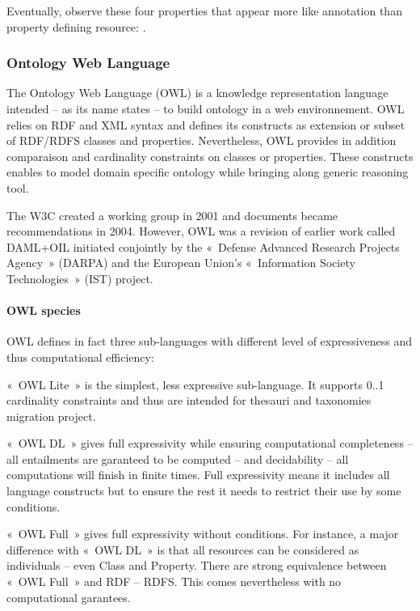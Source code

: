 Eventually, observe these four properties that appear more like annotation than property defining resource: .





\subsubsection*{Ontology Web Language}
The Ontology Web Language (OWL) is a knowledge representation language intended – as its name states – to build ontology in a web environnement. 
OWL relies on RDF and XML syntax and defines its constructs as extension or subset of RDF/RDFS classes and properties. 
Nevertheless, OWL provides in addition comparaison and cardinality constraints on classes or properties. 
These constructs enables to model domain specific ontology while bringing along generic reasoning tool. 

The W3C created a working group in 2001 and documents became recommendations in 2004.
However, OWL was a revision of earlier work called DAML+OIL initiated conjointly by the « Defense Advanced Research Projects Agency » (DARPA) and the European Union's « Information Society Technologies » (IST) project. 

\paragraph{OWL species}
OWL defines in fact three sub-languages with different level of expressiveness and thus computational efficiency:
\begin{liste}
	\item « OWL Lite » is the simplest, less expressive sub-language. It supports 0..1 cardinality constraints and thus are intended for thesauri and taxonomies migration project.

	\item « OWL DL » gives full expressivity while ensuring computational completeness – all entailments are garanteed to be computed – and decidability – all computations will finish in finite times. Full expressivity means it includes all language constructs but to ensure the rest it needs to restrict their use by some conditions. 

	\item « OWL Full » gives full expressivity without conditions. For instance, a major difference with « OWL DL » is that all resources can be considered as individuals – even Class and Property. There are strong equivalence between « OWL Full » and RDF – RDFS. This comes nevertheless with no computational garantees. 
\end{liste}

